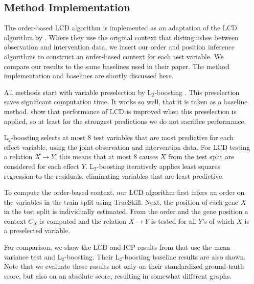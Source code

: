 \subsection{Method Implementation}

The order-based LCD algorithm is implemented as an adaptation of the LCD algorithm by \citet{versteeg2019boosting}. Where they use the original context that distinguishes between observation and intervention data, we insert our order and position inference algorithms to construct an order-based context for each test variable. We compare our results to the same baselines used in their paper. The method implementation and baselines are shortly discussed here. 

All methods start with variable preselection by L$_2$-boosting \citep{schapire1998boosting}. This preselection saves significant computation time. It works so well, that it is taken as a baseline method. \citet{versteeg2019boosting} show that performance of LCD is improved when this preselection is applied, so at least for the strongest predictions we do not sacrifice performance.

L$_2$-boosting selects at most 8 test variables that are most predictive for each effect variable, using the joint observation and intervention data. For LCD testing a relation $X\to Y$, this means that at most 8 causes $X$ from the test split are considered for each effect $Y$. L$_2$-boosting iteratively applies least squares regression to the residuals, eliminating variables that are least predictive. 

To compute the order-based context, our LCD algorithm first infers an order on the variables in the train split using TrueSkill. Next, the position of each gene $X$ in the test split is individually estimated. From the order and the gene position a context $C_X$ is computed and the relation $X\to Y$ is tested for all $Y$'s of which $X$ is a preselected variable. 

For comparison, we show the LCD and ICP results from \citet{versteeg2019boosting} that use the mean-variance test and L$_2$-boosting. Their L$_2$-boosting baseline results are also shown. Note that we evaluate these results not only on their standardized ground-truth score, but also on an absolute score, resulting in somewhat different graphs.